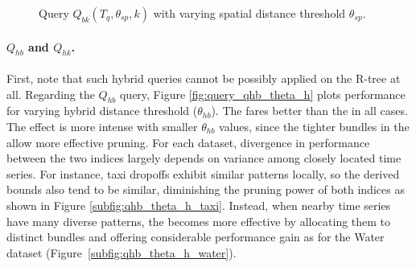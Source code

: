 \begin{figure}[!ht]
	\caption{Query $Q_{bk}(T_q, \theta_{sp}, k)$ with varying spatial distance threshold $\theta_{sp}$.}
	\label{fig:query_qbk_theta_sp}
\end{figure}

\paragraph{$Q_{hb}$ and $Q_{hk}$.} First, note that such hybrid queries cannot be possibly applied on the R-tree at all. Regarding the $Q_{hb}$ query, Figure \ref{fig:query_qhb_theta_h} plots performance for varying hybrid distance threshold ($\theta_{hb}$). The \btsr fares better than the \tsr in all cases. The effect is more intense with smaller $\theta_{hb}$ values, since the tighter bundles in the \btsr allow more effective pruning. For each dataset, divergence in performance between the two indices largely depends on variance among closely located time series. For instance, taxi dropoffs exhibit similar patterns locally, so the derived bounds also tend to be similar, diminishing the pruning power of both indices as shown in Figure \ref{subfig:qhb_theta_h_taxi}. Instead, when nearby time series have many diverse patterns, the \btsr becomes more effective by allocating them to distinct bundles and offering considerable performance gain as for the Water dataset (Figure~\ref{subfig:qhb_theta_h_water}).

